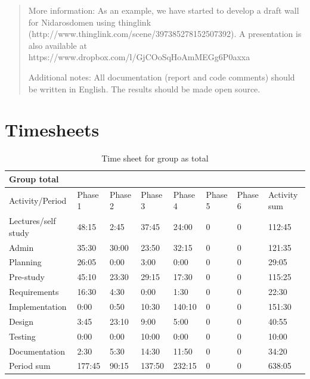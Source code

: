 \documentclass[11pt]{book}
\begin{document}
\begin{quotation}
More information: As an example, we have started to develop a draft wall for Nidarosdomen using thinglink (http://www.thinglink.com/scene/397385278152507392). A presentation is also available at https://www.dropbox.com/l/GjCOoSqHoAmMEGg6P0axxa %

Additional notes: All documentation (report and code comments) should be written in English. The results should be made open source.\cite[p. 47]{compendium}
\end{quotation}

\chapter{Timesheets}
\begin{table}[H]
\centering
\begin{tabular}{| l | l | l | l | l | l | l | l |}
    \hline
    Group total         &          &          &          &          &             &             &                 \\ \hline                        
    Activity/Period     & Phase 1  & Phase 2  & Phase  3 & Phase 4  & Phase 5     & Phase 6     & Activity sum    \\ \hline
    Lectures/self study & 48:15    & 2:45     & 37:45    & 24:00    & 0           & 0           & 112:45       \\ \hline
    Admin               & 35:30    & 30:00    & 23:50    & 32:15    & 0           & 0           & 121:35       \\ \hline
    Planning            & 26:05    & 0:00     & 3:00     & 0:00     & 0           & 0           & 29:05        \\ \hline
    Pre-study           & 45:10    & 23:30    & 29:15    & 17:30    & 0           & 0           & 115:25       \\ \hline
    Requirements        & 16:30    & 4:30     & 0:00     & 1:30     & 0           & 0           & 22:30        \\ \hline
    Implementation      & 0:00     & 0:50     & 10:30    & 140:10   & 0           & 0           & 151:30       \\ \hline
    Design              & 3:45     & 23:10    & 9:00     & 5:00     & 0           & 0           & 40:55        \\ \hline
    Testing             & 0:00     & 0:00     & 10:00    & 0:00     & 0           & 0           & 10:00        \\ \hline
    Documentation       & 2:30     & 5:30     & 14:30    & 11:50    & 0           & 0           & 34:20        \\ \hline
    Period sum          & 177:45   & 90:15    & 137:50   & 232:15   & 0           & 0           & 638:05       \\ \hline
\end{tabular}
\caption{Time sheet for group as total}
\label{tab:appendix_timesheets_group}
\end{table}
\end{document}
